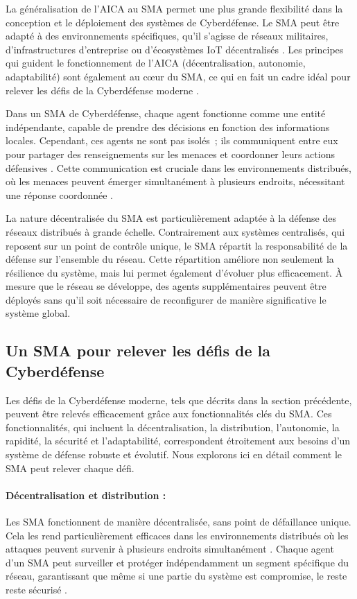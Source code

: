La généralisation de l'AICA au SMA permet une plus grande flexibilité dans la conception et le déploiement des systèmes de Cyberdéfense. Le SMA peut être adapté à des environnements spécifiques, qu'il s'agisse de réseaux militaires, d'infrastructures d'entreprise ou d'écosystèmes IoT décentralisés \cite{kott2023autonomous}. Les principes qui guident le fonctionnement de l'AICA (décentralisation, autonomie, adaptabilité) sont également au cœur du SMA, ce qui en fait un cadre idéal pour relever les défis de la Cyberdéfense moderne \cite{kolias2011swarm}.

Dans un SMA de Cyberdéfense, chaque agent fonctionne comme une entité indépendante, capable de prendre des décisions en fonction des informations locales. Cependant, ces agents ne sont pas isolés~; ils communiquent entre eux pour partager des renseignements sur les menaces et coordonner leurs actions défensives \cite{kolias2011swarm}. Cette communication est cruciale dans les environnements distribués, où les menaces peuvent émerger simultanément à plusieurs endroits, nécessitant une réponse coordonnée \cite{bace2001intrusion}.

La nature décentralisée du SMA est particulièrement adaptée à la défense des réseaux distribués à grande échelle. Contrairement aux systèmes centralisés, qui reposent sur un point de contrôle unique, le SMA répartit la responsabilité de la défense sur l'ensemble du réseau. Cette répartition améliore non seulement la résilience du système, mais lui permet également d'évoluer plus efficacement. À mesure que le réseau se développe, des agents supplémentaires peuvent être déployés sans qu'il soit nécessaire de reconfigurer de manière significative le système global.

\subsection{Un SMA pour relever les défis de la Cyberdéfense}

Les défis de la Cyberdéfense moderne, tels que décrits dans la section précédente, peuvent être relevés efficacement grâce aux fonctionnalités clés du SMA. Ces fonctionnalités, qui incluent la décentralisation, la distribution, l'autonomie, la rapidité, la sécurité et l'adaptabilité, correspondent étroitement aux besoins d'un système de défense robuste et évolutif. Nous explorons ici en détail comment le SMA peut relever chaque défi.

\paragraph{Décentralisation et distribution :}
Les SMA fonctionnent de manière décentralisée, sans point de défaillance unique. Cela les rend particulièrement efficaces dans les environnements distribués où les attaques peuvent survenir à plusieurs endroits simultanément \cite{kolias2011swarm}. Chaque agent d'un SMA peut surveiller et protéger indépendamment un segment spécifique du réseau, garantissant que même si une partie du système est compromise, le reste reste sécurisé \cite{shakarian2015cyber}.

